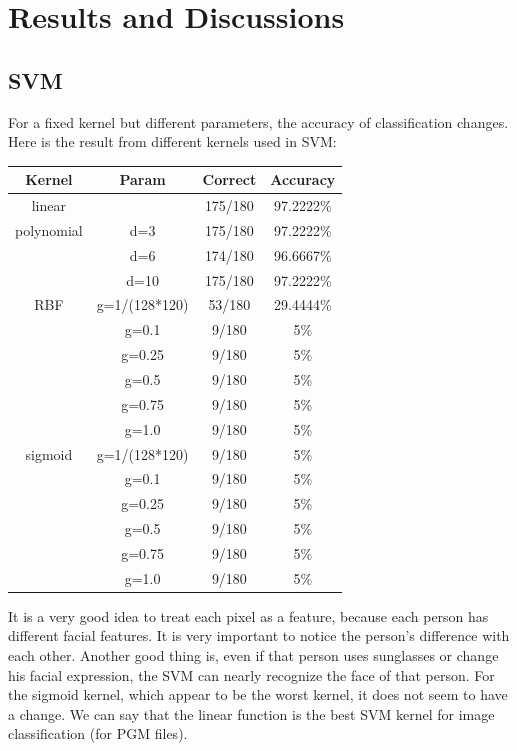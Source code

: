 \documentclass[10pt, twocolumn]{article}
\newcommand{\head}[1]{\textnormal{\textbf{#1}}}
\begin{document}
	\section{Results and Discussions}
	\subsection{SVM}
	For a fixed kernel but different parameters, the accuracy of classification changes.
	Here is the result from different kernels used in SVM:
	\begin{center}
	\begin{tabular}{c c c c}
		\hline
		\head{Kernel} & \head{Param} & \head{Correct} & \head{Accuracy}\\
		\hline
		linear & & 175/180 & 97.2222\% \\
		polynomial & d=3 & 175/180 & 97.2222\% \\
		 & d=6 & 174/180 & 96.6667\% \\
		 & d=10 & 175/180 & 97.2222\% \\
		RBF & g=1/(128*120) & 53/180 & 29.4444\% \\
		 & g=0.1 & 9/180 & 5\% \\
		 & g=0.25 & 9/180 & 5\% \\
		 & g=0.5 & 9/180 & 5\% \\
		 & g=0.75 & 9/180 & 5\% \\
		 & g=1.0 & 9/180 & 5\% \\
		sigmoid & g=1/(128*120) & 9/180 & 5\% \\
		 & g=0.1 & 9/180 & 5\% \\
		 & g=0.25 & 9/180 & 5\% \\
		 & g=0.5 & 9/180 & 5\% \\
		 & g=0.75 & 9/180 & 5\% \\
		 & g=1.0 & 9/180 & 5\% \\
		\hline
	\end{tabular}
	\end{center}
	It is a very good idea to treat each pixel as a feature, because each person has different facial features.
	It is very important to notice the person's difference with each other.
	Another good thing is, even if that person uses sunglasses or change his facial expression, the SVM can nearly recognize the face of that person.
	For the sigmoid kernel, which appear to be the worst kernel, it does not seem to have a change.
	We can say that the linear function is the best SVM kernel for image classification (for PGM files).
\end{document}
